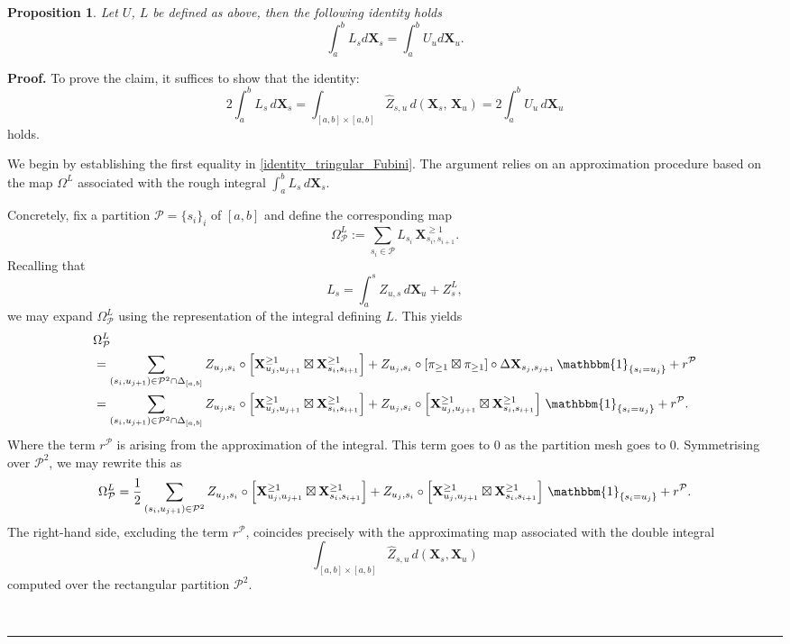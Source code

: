 \documentclass{article}%
\newtheorem{proposition}[theorem]{Proposition}
\newenvironment{proof}[1][Proof]{\noindent\textbf{#1.} }{\ \rule{0.5em}{0.5em}}
\begin{document}
\begin{proposition}
    Let $U$, $L$ be defined as above, then the following identity holds
\[
\int_a^b L_s d\mathbf{X}_s = \int_a^b U_u d\mathbf{X}_u. 
\]  
\end{proposition}
\begin{proof}
To prove the claim, it suffices to show that the identity:
\begin{equation}
2 \int_a^b L_s \, d\mathbf{X}_s
= \int_{[a,b]\times[a,b]} \hat{Z}_{s,u} \, d(\mathbf{X}_s, \, \mathbf{X}_u)
=  2\int_a^b U_u \, d\mathbf{X}_u
\end{equation}
holds.

We begin by establishing the first equality in \eqref{identity_tringular_Fubini}. The argument relies on an approximation
procedure based on the map $\Omega^L$ associated with the rough integral
$\int_a^b L_s \, d\mathbf{X}_s$.

Concretely, fix a partition $\mathcal{P}=\{s_i\}_i$ of $[a,b]$ and define the corresponding map
\[
\Omega^L_{\mathcal{P}}
:= \sum_{s_i \in \mathcal{P}} L_{s_i}\, \mathbf{X}^{\geq 1}_{s_i,s_{i+1}} .
\]
Recalling that
\[
L_s = \int_a^s Z_{u,s}\, d\mathbf{X}_u
+ Z^L_{s},
\]
we may expand $\Omega^L_{\mathcal{P}}$ using the  representation of the integral
defining $L$. This yields
\begin{align*}
&\Omega^L_{\mathcal{P}} \\
&= \sum_{(s_i,u_{j+1})\in \mathcal{P}^2\cap \Delta_{[a,b]}}
Z_{u_j,s_i} \circ
\left[\mathbf{X}^{\geq 1}_{u_j,u_{j+1}} \boxtimes
\mathbf{X}^{\geq 1}_{s_i,s_{i+1}}\right]
+ Z_{u_j,s_i} \circ
[\pi_{\geq 1} \boxtimes \pi_{\geq 1}]\circ \Delta\mathbf{X}_{s_j, s_{j+1}}\,
\mathbbm{1}_{\{s_i=u_j\}} + r^\mathcal{P} \\
&= \sum_{(s_i,u_{j+1})\in \mathcal{P}^2\cap \Delta_{[a,b]}}
Z_{u_j,s_i} \circ
\left[\mathbf{X}^{\geq 1}_{u_j,u_{j+1}} \boxtimes
\mathbf{X}^{\geq 1}_{s_i,s_{i+1}}\right]
+ Z_{u_j,s_i} \circ
\left[\mathbf{X}^{\geq 1}_{u_j,u_{j+1}} \boxtimes
\mathbf{X}^{\geq 1}_{s_i,s_{i+1}}\right]
\,\mathbbm{1}_{\{s_i=u_j\}} + r^\mathcal{P}.
\end{align*}
Where the term $r^\mathcal{P}$ is arising from the approximation of the integral. This term goes to 0 as the partition mesh goes to 0.\newline
Symmetrising over $\mathcal{P}^2$, we may rewrite this as
\begin{align*}
\Omega^L_{\mathcal{P}}
= \frac12 \sum_{(s_i,u_{j+1})\in \mathcal{P}^2}
Z_{u_j,s_i} \circ
\left[\mathbf{X}^{\geq 1}_{u_j,u_{j+1}} \boxtimes
\mathbf{X}^{\geq 1}_{s_i,s_{i+1}}\right]
+ Z_{u_j,s_i} \circ
\left[\mathbf{X}^{\geq 1}_{u_j,u_{j+1}} \boxtimes
\mathbf{X}^{\geq 1}_{s_i,s_{i+1}}\right]
\,\mathbbm{1}_{\{s_i=u_j\}} + r^\mathcal{P}.
\end{align*}
The right-hand side, excluding the term $r^\mathcal{P}$, coincides precisely with the approximating map associated with the
double integral
\[
\int_{[a,b]\times[a,b]} \hat{Z}_{s,u}\,
d\left(\mathbf{X}_s, \mathbf{X}_u\right)
\]
computed over the rectangular partition $\mathcal{P}^2$.


\end{proof}
\end{document}
